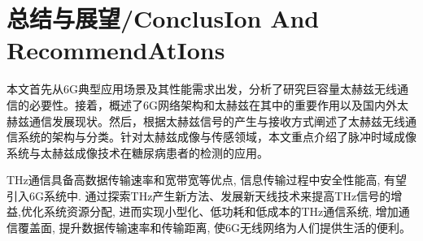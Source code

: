\section{总结与展望/ConclusIon And RecommendAtIons}

本文首先从6G典型应用场景及其性能需求出发，分析了研究巨容量太赫兹无线通信的必要性。接着，概述了6G网络架构和太赫兹在其中的重要作用以及国内外太赫兹通信发展现状。然后，根据太赫兹信号的产生与接收方式阐述了太赫兹无线通信系统的架构与分类。针对太赫兹成像与传感领域，本文重点介绍了脉冲时域成像系统与太赫兹成像技术在糖尿病患者的检测的应用。

THz通信具备高数据传输速率和宽带宽等优点, 信息传输过程中安全性能高, 有望引入6G系统中. 通过探索THz产生新方法、发展新天线技术来提高THz信号的增益,优化系统资源分配, 进而实现小型化、低功耗和低成本的THz通信系统, 增加通信覆盖面, 提升数据传输速率和传输距离, 使6G无线网络为人们提供生活的便利。